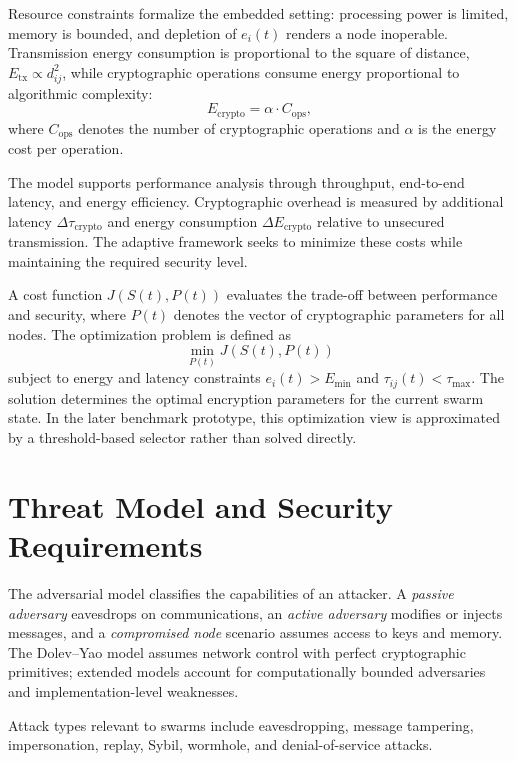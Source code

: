 Resource constraints formalize the embedded setting: processing power is limited, memory is bounded, and depletion of $e_i(t)$ renders a node inoperable. Transmission energy consumption is proportional to the square of distance, $E_{\text{tx}} \propto d_{ij}^2$, while cryptographic operations consume energy proportional to algorithmic complexity:
\begin{equation}
E_{\text{crypto}} = \alpha \cdot C_{\text{ops}},
\label{eq:crypto_energy}
\end{equation}
where $C_{\text{ops}}$ denotes the number of cryptographic operations and $\alpha$ is the energy cost per operation.

The model supports performance analysis through throughput, end-to-end latency, and energy efficiency. Cryptographic overhead is measured by additional latency $\Delta \tau_{\text{crypto}}$ and energy consumption $\Delta E_{\text{crypto}}$ relative to unsecured transmission. The adaptive framework seeks to minimize these costs while maintaining the required security level.

A cost function $J(S(t), P(t))$ evaluates the trade-off between performance and security, where $P(t)$ denotes the vector of cryptographic parameters for all nodes. The optimization problem is defined as
\[
\min_{P(t)} J(S(t), P(t))
\]
subject to energy and latency constraints $e_i(t) > E_{\min}$ and $\tau_{ij}(t) < \tau_{\max}$. The solution determines the optimal encryption parameters for the current swarm state.
In the later benchmark prototype, this optimization view is approximated by a threshold-based selector rather than solved directly.

\section{Threat Model and Security Requirements}
\label{sec:threat_model}

The adversarial model classifies the capabilities of an attacker. A \emph{passive adversary} eavesdrops on communications, an \emph{active adversary} modifies or injects messages, and a \emph{compromised node} scenario assumes access to keys and memory. The Dolev--Yao model assumes network control with perfect cryptographic primitives; extended models account for computationally bounded adversaries and implementation-level weaknesses.

Attack types relevant to swarms include eavesdropping, message tampering, impersonation, replay, Sybil, wormhole, and denial-of-service attacks.

